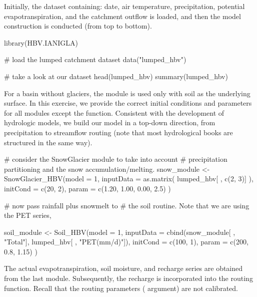 Initially, the dataset containing: date, air temperature, precipitation, potential evapotranspiration, and the catchment outflow
is loaded, and then the model construction is conducted (from top to bottom).

\begin{example}
library(HBV.IANIGLA)

# load the lumped catchment dataset
data("lumped_hbv")

# take a look at our dataset
head(lumped_hbv)
summary(lumped_hbv)
\end{example}

For a basin without glaciers,  the  module is used only with soil as the underlying surface. 
In this exercise, we provide the correct initial conditions and parameters for all modules except the 
function. Consistent with the development of hydrologic models, we build our model in a top-down direction, 
from precipitation to streamflow routing (note that most hydrological books are structured in the same way).

\begin{example}
# consider the SnowGlacier module to take into account 
# precipitation partitioning and the snow accumulation/melting. 
snow_module <-
  SnowGlacier_HBV(model = 1, 
                  inputData = as.matrix( lumped_hbv[ , c(2, 3)] ),
                  initCond = c(20, 2), 
                  param = c(1.20, 1.00, 0.00, 2.5) )
                  
# now pass rainfall plus snowmelt to 
# the soil routine. Note that we are using the PET series,                 

soil_module <-
  Soil_HBV(model = 1,
           inputData = cbind(snow_module[ , "Total"], lumped_hbv[ , "PET(mm/d)"]),
           initCond = c(100, 1),
           param = c(200, 0.8, 1.15) ) 
\end{example}

The actual evapotranspiration, soil moisture, and recharge series are obtained from the last module. Subsequently, the recharge is
incorporated into the routing function. Recall that the routing parameters ( argument) are not calibrated.

